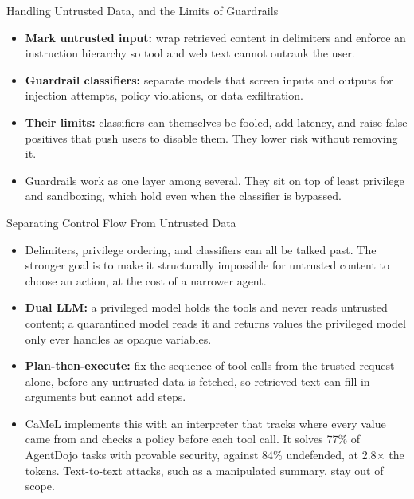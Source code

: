 \begin{frame}{Handling Untrusted Data, and the Limits of Guardrails}
  \begin{itemize}\itemsep0.5em
    \item[\textcolor{KAred}{$\blacktriangleright$}] \textbf{Mark untrusted input:} wrap retrieved content in delimiters and enforce an instruction hierarchy so tool and web text cannot outrank the user.
    \item[\textcolor{KAred}{$\blacktriangleright$}] \textbf{Guardrail classifiers:} separate models that screen inputs and outputs for injection attempts, policy violations, or data exfiltration.
    \item[\textcolor{KAred}{$\blacktriangleright$}] \textbf{Their limits:} classifiers can themselves be fooled, add latency, and raise false positives that push users to disable them. They lower risk without removing it.
    \item[\textcolor{KAred}{$\blacktriangleright$}] Guardrails work as one layer among several. They sit on top of least privilege and sandboxing, which hold even when the classifier is bypassed.
  \end{itemize}
\end{frame}

\begin{frame}{Separating Control Flow From Untrusted Data}
  \begin{itemize}\itemsep0.35em
    \item[\textcolor{KAred}{$\blacktriangleright$}] Delimiters, privilege ordering, and classifiers can all be talked past. The stronger goal is to make it structurally impossible for untrusted content to choose an action, at the cost of a narrower agent.
    \item[\textcolor{KAred}{$\blacktriangleright$}] \textbf{Dual LLM:} a privileged model holds the tools and never reads untrusted content; a quarantined model reads it and returns values the privileged model only ever handles as opaque variables.
    \item[\textcolor{KAred}{$\blacktriangleright$}] \textbf{Plan-then-execute:} fix the sequence of tool calls from the trusted request alone, before any untrusted data is fetched, so retrieved text can fill in arguments but cannot add steps.
    \item[\textcolor{KAred}{$\blacktriangleright$}] CaMeL implements this with an interpreter that tracks where every value came from and checks a policy before each tool call. It solves 77\% of AgentDojo tasks with provable security, against 84\% undefended, at 2.8$\times$ the tokens. Text-to-text attacks, such as a manipulated summary, stay out of scope.
  \end{itemize}
\end{frame}
